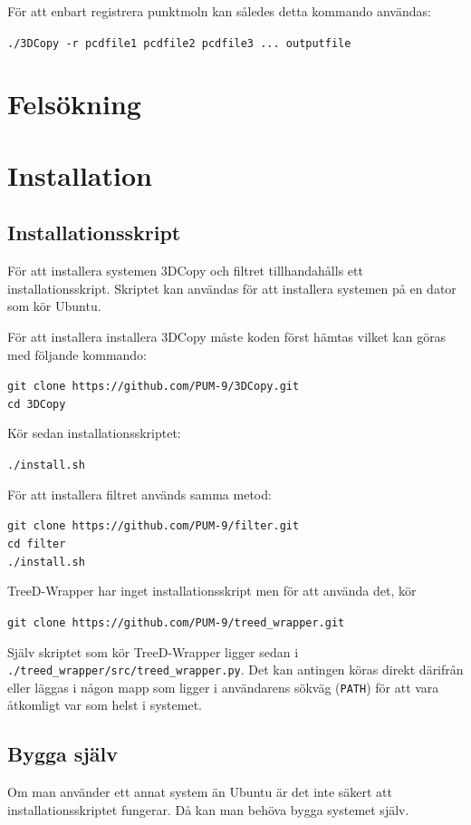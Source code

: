 \documentclass[a4paper,titlepage,12pt]{article}
\begin{document}
		För att enbart registrera punktmoln kan således detta kommando användas:
		
		\texttt{./3DCopy -r pcdfile1 pcdfile2 pcdfile3 ... outputfile}
\newpage
    
\section{Felsökning}
\newpage
    
\section{Installation}
\subsection{Installationsskript}
	För att installera systemen 3DCopy och filtret tillhandahålls ett installationsskript. Skriptet kan användas för att installera systemen på en dator som kör Ubuntu.
	
	För att installera installera 3DCopy måste koden först hämtas vilket kan göras med följande kommando:
	
	\texttt{git clone https://github.com/PUM-9/3DCopy.git \\
	cd 3DCopy}
	
	Kör sedan installationsskriptet:
	
	\texttt{./install.sh}
	
	För att installera filtret används samma metod:
	
	\texttt{git clone https://github.com/PUM-9/filter.git \\
	cd filter \\
	./install.sh}
	
	TreeD-Wrapper har inget installationsskript men för att använda det, kör
	
	\texttt{git clone https://github.com/PUM-9/treed\_wrapper.git}
	
	Själv skriptet som kör TreeD-Wrapper ligger sedan i \texttt{./treed\_wrapper/src/treed\_wrapper.py}. Det kan antingen köras direkt därifrån eller läggas i någon mapp som ligger i användarens sökväg (\texttt{PATH}) för att vara åtkomligt var som helst i systemet.
	
\subsection{Bygga själv}
	Om man använder ett annat system än Ubuntu är det inte säkert att installationsskriptet fungerar. Då kan man behöva bygga systemet själv.
	
\end{document}
